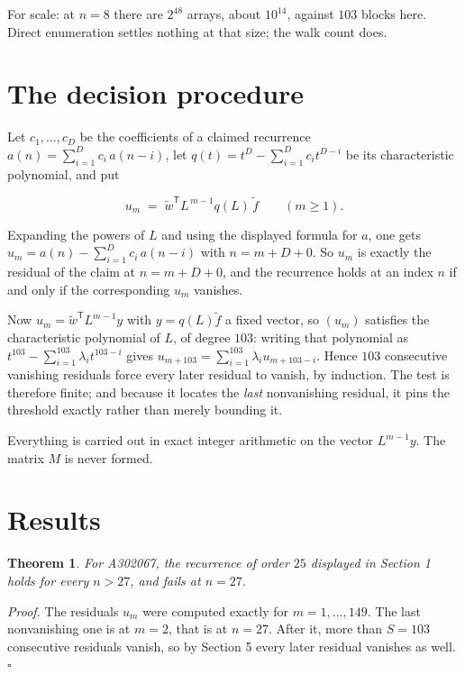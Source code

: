 \documentclass[11pt]{article}
\newtheorem{theorem}{Theorem}
\theoremstyle{definition}
\begin{document}
For scale: at $n = 8$ there are $2^{48}$ arrays, about $10^{14}$, against $103$ blocks here. Direct enumeration settles nothing at that size; the walk count does.

\section{The decision procedure}

Let $c_1,\dots,c_D$ be the coefficients of a claimed recurrence $a(n) = \sum_{i=1}^{D} c_i\,a(n-i)$, let $q(t) = t^{D} - \sum_{i=1}^{D} c_i t^{D-i}$ be its characteristic polynomial, and put

\[u_m \;=\; \tilde w^{\mathsf T} L^{\,m-1} q(L)\,\tilde f \qquad (m \ge 1).\]

Expanding the powers of $L$ and using the displayed formula for $a$, one gets $u_m = a(n) - \sum_{i=1}^{D} c_i\,a(n-i)$ with $n = m + D + 0$. So $u_m$ is exactly the residual of the claim at $n = m + D + 0$, and the recurrence holds at an index $n$ if and only if the corresponding $u_m$ vanishes.

Now $u_m = \tilde w^{\mathsf T} L^{m-1} y$ with $y = q(L)\tilde f$ a fixed vector, so $(u_m)$ satisfies the characteristic polynomial of $L$, of degree $103$: writing that polynomial as $t^{103} - \sum_{i=1}^{103} \lambda_i t^{103-i}$ gives $u_{m+103} = \sum_{i=1}^{103} \lambda_i u_{m+103-i}$. Hence $103$ consecutive vanishing residuals force every later residual to vanish, by induction. The test is therefore finite; and because it locates the {\itshape last} nonvanishing residual, it pins the threshold exactly rather than merely bounding it.

Everything is carried out in exact integer arithmetic on the vector $L^{m-1}y$. The matrix $M$ is never formed.

\section{Results}

\begin{theorem} For A302067, the recurrence of order $25$ displayed in Section 1 holds for every $n > 27$, and fails at $n = 27$.\end{theorem}

{\itshape Proof.} The residuals $u_m$ were computed exactly for $m = 1,\dots,149$. The last nonvanishing one is at $m = 2$, that is at $n = 27$. After it, more than $S = 103$ consecutive residuals vanish, so by Section 5 every later residual vanishes as well. $\square$
\end{document}
